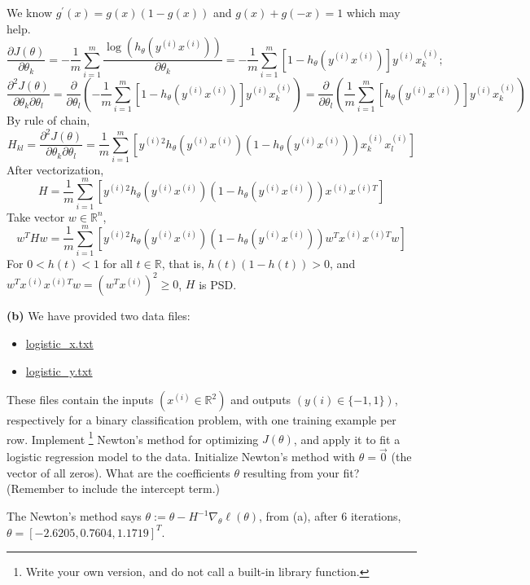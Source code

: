 \documentclass[11pt]{article}
\renewcommand\part[1]{\vspace{.10in}\textbf{(#1)  }}
\begin{document}
We know $g^\prime (x) = g(x)(1-g(x))$ and $g(x)+g(-x) = 1$ which may help.
$$\frac{\partial J(\theta)}{\partial \theta_k} = -\frac{1}{m}\sum_{i=1}^{m}\frac{\log(h_\theta(y^{(i)}x^{(i)}))}{\partial \theta_k} = -\frac{1}{m}\sum_{i=1}^{m}\left[1-h_\theta (y^{(i)}x^{(i)})\right]y^{(i)}x^{(i)}_{k};$$
$$\frac{\partial^2 J(\theta)}{\partial \theta_k\partial \theta_l} = \frac{\partial}{\partial \theta_l}\left(-\frac{1}{m}\sum_{i=1}^{m}\left[1-h_\theta (y^{(i)}x^{(i)})\right]y^{(i)}x^{(i)}_{k}\right) = \frac{\partial}{\partial \theta_l}\left(\frac{1}{m}\sum_{i=1}^{m}\left[h_\theta (y^{(i)}x^{(i)})\right]y^{(i)}x^{(i)}_{k}\right)$$
By rule of chain,$$H_{kl} = \frac{\partial^2 J(\theta)}{\partial \theta_k\partial \theta_l} = \frac{1}{m}\sum_{i=1}^{m}\left[y^{(i)2}h_\theta(y^{(i)}x^{(i)})\left(1-h_\theta(y^{(i)}x^{(i)})\right)x^{(i)}_{k}x^{(i)}_{l}\right]$$
After vectorization, $$H = \frac{1}{m}\sum_{i=1}^{m}\left[y^{(i)2}h_\theta(y^{(i)}x^{(i)})\left(1-h_\theta(y^{(i)}x^{(i)})\right)x^{(i)}x^{(i)T}\right]$$
Take vector $w \in \mathbb{R}^n$, $$w^THw = \frac{1}{m}\sum_{i=1}^{m}\left[y^{(i)2}h_\theta(y^{(i)}x^{(i)})\left(1-h_\theta(y^{(i)}x^{(i)})\right)w^T x^{(i)}x^{(i)T}w\right]$$
For $0<h(t)<1$ for all $t \in \mathbb{R}$, that is, $h(t)(1-h(t))>0$, and $w^T x^{(i)}x^{(i)T}w = (w^Tx^{(i)})^2 \geq 0$, $H$ is PSD.

\part{b} We have provided two data files:
\begin{itemize}
\item \href{http://cs229.stanford.edu/ps/ps1/logistic_x.txt}{logistic\_x.txt}
\item \href{http://cs229.stanford.edu/ps/ps1/logistic_y.txt}{logistic\_y.txt}
\end{itemize}
These files contain the inputs $(x^{(i)} \in \mathbb{R}^2)$ and outputs $(y(i) \in \{ -1, 1\})$, respectively for a binary classification problem, with one training example per row. Implement \footnote{Write your own version, and do not call a built-in library function.} Newton's method for optimizing $J(\theta)$, and apply it to fit a logistic regression model to the data. Initialize Newton's method with $\theta = \overrightarrow{0}$ (the vector of all zeros). What are the coefficients $\theta$ resulting from your fit? (Remember to include the intercept term.)

The Newton's method says $\theta := \theta - H^{-1}\nabla_\theta \ell(\theta)$, from (a), after 6 iterations, $\theta = [-2.6205,0.7604,1.1719]^T$.

\end{document}
